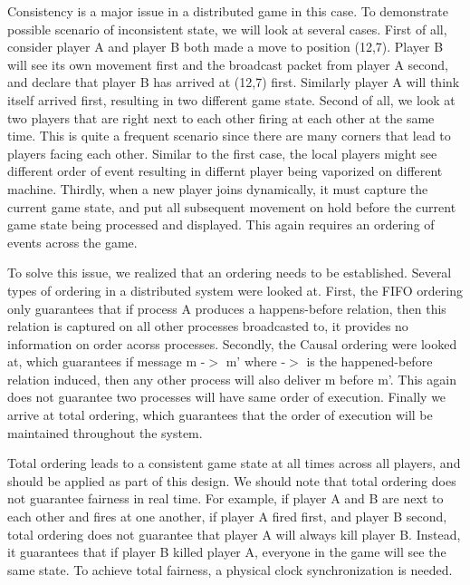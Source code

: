 Consistency is a major issue in a distributed game in this case. To demonstrate possible scenario of inconsistent state, we will look at several cases. First of all, consider player A and player B both made a move to position (12,7). Player B will see its own movement first and the broadcast packet from player A second, and declare that player B has arrived at (12,7) first. Similarly player A will think itself arrived first, resulting in two different game state. Second of all, we look at two players that are right next to each other firing at each other at the same time. This is quite a frequent scenario since there are many corners that lead to players facing each other. Similar to the first case, the local players might see different order of event resulting in differnt player being vaporized on different machine. Thirdly, when a new player joins dynamically, it must capture the current game state, and put all subsequent movement on hold before the current game state being processed and displayed. This again requires an ordering of events across the game.

To solve this issue, we realized that an ordering needs to be established. Several types of ordering in a distributed system were looked at. First, the FIFO ordering only guarantees that if process A produces a happens-before relation, then this relation is captured on all other processes broadcasted to, it provides no information on order acorss processes. Secondly, the Causal ordering were looked at, which guarantees if message m -$>$ m' where -$>$ is the happened-before relation induced, then any other process will also deliver m before m'. This again does not guarantee two processes will have same order of execution. Finally we arrive at total ordering, which guarantees that the order of execution will be maintained throughout the system.

Total ordering leads to a consistent game state at all times across all players, and should be applied as part of this design. We should note that total ordering does not guarantee fairness in real time. For example, if player A and B are next to each other and fires at one another, if player A fired first, and player B second, total ordering does not guarantee that player A will always kill player B. Instead, it guarantees that if player B killed player A, everyone in the game will see the same state. To achieve total fairness, a physical clock synchronization is needed.
